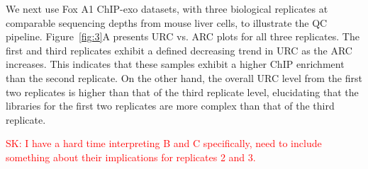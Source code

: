 \documentclass{bmcart}
\newcommand{\SK}[1]{\textcolor{red}{SK: #1}}
\begin{document}
We next use Fox A1 ChIP-exo datasets, with three biological replicates
at comparable sequencing depths from mouse liver cells, to illustrate
the QC pipeline.  Figure~\ref{fig:3}A presents URC vs. ARC plots
for all three replicates. The first and third replicates exhibit a
defined decreasing trend in URC as the ARC increases. This indicates
that these samples exhibit a higher ChIP enrichment than the second
replicate. On the other hand, the overall URC level from the first two
replicates is higher than that of the third replicate level,
elucidating that the libraries for the first two replicates are more
complex than that of the third replicate.




\SK{I have a hard time interpreting B and C specifically, need to
  include something about their implications for replicates 2 and 3.}
\end{document}
